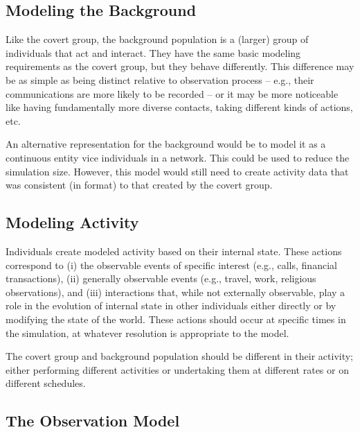 \documentclass{article}
\begin{document}
\subsection*{Modeling the Background}
Like the covert group, the background population is a (larger) group of individuals that act and interact.  They have the same basic modeling requirements as the covert group, but they behave differently.  This difference may be as simple as being distinct relative to observation process -- e.g., their communications are more likely to be recorded -- or it may be more noticeable like having fundamentally more diverse contacts, taking different kinds of actions, etc.

An alternative representation for the background would be to model it as a continuous entity vice individuals in a network.  This could be used to reduce the simulation size.  However, this model would still need to create activity data that was consistent (in format) to that created by the covert group.

\subsection*{Modeling Activity}
Individuals create modeled activity based on their internal state.  These actions correspond to (i) the observable events of specific interest (e.g., calls, financial transactions), (ii) generally observable events (e.g., travel, work, religious observations), and (iii) interactions that, while not externally observable, play a role in the evolution of internal state in other individuals either directly or by modifying the state of the world.  These actions should occur at specific times in the simulation, at whatever resolution is appropriate to the model.

The covert group and background population should be different in their activity; either performing different activities or undertaking them at different rates or on different schedules.

\subsection*{The Observation Model}

\end{document}
